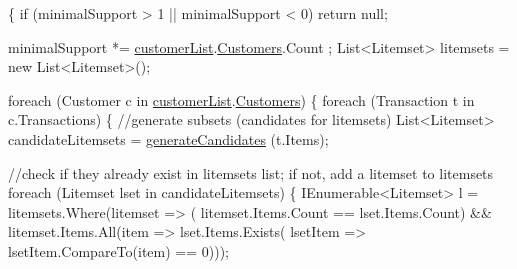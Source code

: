\begin{DoxyCode}
        \{
            \textcolor{keywordflow}{if} (minimalSupport > 1 || minimalSupport < 0)
                \textcolor{keywordflow}{return} null; 
            
            minimalSupport *= \hyperlink{class_apriori_all_lib_1_1_apriori_abbca8be3761136e76782ce10ebd61638}{customerList}.\hyperlink{class_apriori_all_lib_1_1_customer_list_a4fd2a16a984844e61ffc60b327e6534a}{Customers}.Count
      ;
            List<Litemset> litemsets = \textcolor{keyword}{new} List<Litemset>();

            \textcolor{keywordflow}{foreach} (Customer c \textcolor{keywordflow}{in} \hyperlink{class_apriori_all_lib_1_1_apriori_abbca8be3761136e76782ce10ebd61638}{customerList}.\hyperlink{class_apriori_all_lib_1_1_customer_list_a4fd2a16a984844e61ffc60b327e6534a}{Customers})
            \{
                \textcolor{keywordflow}{foreach} (Transaction t \textcolor{keywordflow}{in} c.Transactions)
                \{
                    \textcolor{comment}{//generate subsets (candidates for litemsets)}
                    List<Litemset> candidateLitemsets = \hyperlink{class_apriori_all_lib_1_1_apriori_a79d720678f873cfb665fe6cbf4bf32ae}{generateCandidates}
      (t.Items);

                    \textcolor{comment}{//check if they already exist in litemsets list; if not,
       add a litemset to litemsets}
                    \textcolor{keywordflow}{foreach} (Litemset lset \textcolor{keywordflow}{in} candidateLitemsets)
                    \{
                        IEnumerable<Litemset> l = litemsets.Where(litemset => (
      litemset.Items.Count == lset.Items.Count) &&
                            litemset.Items.All(item => lset.Items.Exists(
      lsetItem => lsetItem.CompareTo(item) == 0)));


\end{DoxyCode}
